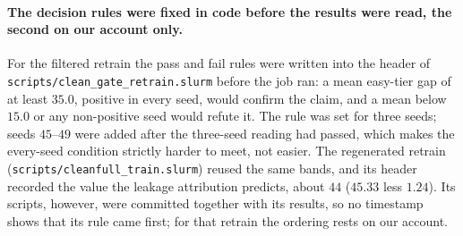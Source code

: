 \paragraph{The decision rules were fixed in code before the results were read, the second on our account only.}
For the filtered retrain the pass and fail rules were written into the header of \texttt{scripts/clean\_gate\_retrain.slurm} before the job ran: a mean easy-tier gap of at least $35.0$, positive in every seed, would confirm the claim, and a mean below $15.0$ or any non-positive seed would refute it. The rule was set for three seeds; seeds $45$--$49$ were added after the three-seed reading had passed, which makes the every-seed condition strictly harder to meet, not easier. The regenerated retrain (\texttt{scripts/cleanfull\_train.slurm}) reused the same bands, and its header recorded the value the leakage attribution predicts, about $44$ ($45.33$ less $1.24$). Its scripts, however, were committed together with its results, so no timestamp shows that its rule came first; for that retrain the ordering rests on our account.

